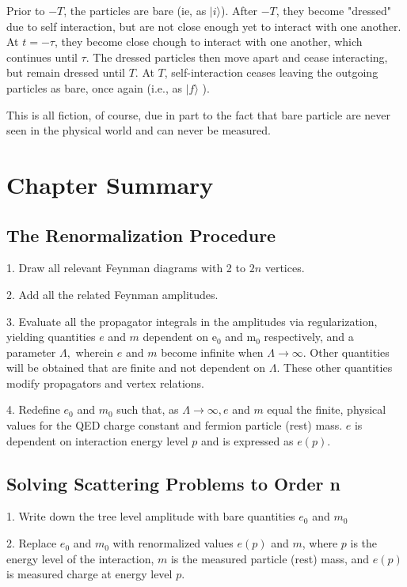 Prior to $-T$, the particles are bare (ie, as $|i\rangle$). After $-T$, they become "dressed" due to self interaction, but are not close enough yet to interact with one another. At $t=-\tau$, they become close chough to interact with one another, which continues until $\tau$. The dressed particles then move apart and cease interacting, but remain dressed until $T$. At $T$, self-interaction ceases leaving the outgoing particles as bare, once again (i.e., as $|f\rangle$ ).

This is all fiction, of course, due in part to the fact that bare particle are never seen in the physical world and can never be measured. 

\section{Chapter Summary}
\subsection{The Renormalization Procedure}
1. Draw all relevant Feynman diagrams with 2 to $2 n$ vertices.

2. Add all the related Feynman amplitudes.

3. Evaluate all the propagator integrals in the amplitudes via regularization, yielding quantities $e$ and $m$ dependent on $\mathrm{e}_0$ and $\mathrm{m}_0$ respectively, and a parameter $\Lambda,$ wherein $e$ and $m$ become infinite when $\Lambda \rightarrow \infty$. Other quantities will be obtained that are finite and not dependent on $\Lambda$. These other quantities modify propagators and vertex relations.

4. Redefine $e_0$ and $m_0$ such that, as $\Lambda \rightarrow \infty, e$ and $m$ equal the finite, physical values for the QED charge constant and fermion particle (rest) mass. $e$ is dependent on interaction energy level $p$ and is expressed as $e(p)$.

\subsection{Solving Scattering Problems to Order n}
1. Write down the tree level amplitude with bare quantities $e_{0}$ and $m_{0}$

2. Replace $e_0$ and $m_0$ with renormalized values $e(p)$ and $m$, where $p$ is the energy level of the interaction, $m$ is the measured particle (rest) mass, and $e(p)$ is measured charge at energy level $p$.

